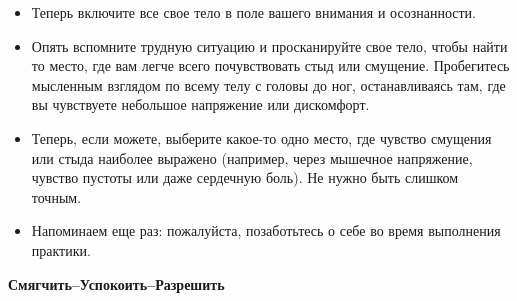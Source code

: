 \begin{itemize}
	\item Теперь включите все свое тело в поле вашего внимания и осознанности.
	
	\item Опять вспомните трудную ситуацию и просканируйте свое тело, чтобы найти то место, где вам легче всего почувствовать стыд или смущение. Пробегитесь мысленным взглядом по всему телу с головы до ног, останавливаясь там, где вы чувствуете небольшое напряжение или дискомфорт. 

	\item Теперь, если можете, выберите какое-то одно место, где чувство смущения или стыда наиболее выражено (например, через мышечное напряжение, чувство пустоты или даже сердечную боль). Не нужно быть слишком точным. 

	\item Напоминаем еще раз: пожалуйста, позаботьтесь о себе во время выполнения практики. 
\end{itemize}

\vspace{3ex}

{\large \textbf{Смягчить--Успокоить--Разрешить}}

\vspace{1ex}


